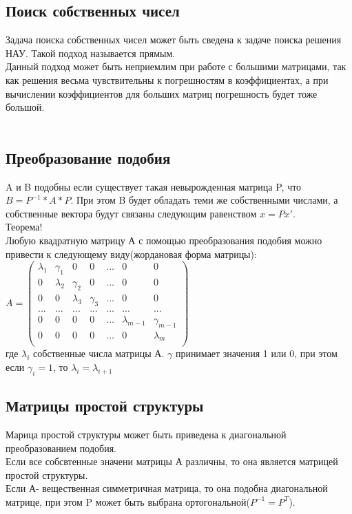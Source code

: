 \documentclass[16pt]{article}
\begin{document}
            \subsection{Поиск собственных чисел}
                Задача поиска собственных чисел может быть сведена к задаче поиска решения НАУ. Такой подход называется прямым.\\
                Данный подход может быть неприемлим при работе с большими матрицами, так как решения весьма чувствительны к погрешностям в коэффициентах, а при вычислении коэффициентов для больших матриц погрешность будет тоже большой.\\ \\
            \subsection{Преобразование подобия}
                A и B подобны если существует такая невырожденная матрица P, что $B = P^{-1}*A*P$. При этом B будет обладать теми же собственными числами, а собственные вектора будут связаны следующим равенством $x=Px'$.\\
                Теорема!\\
                Любую квадратную матрицу А с помощью преобразования подобия можно привести к следующему виду(жордановая форма матрицы):\\
                $A = 
                \begin{pmatrix}
                \lambda_1 & \gamma_1 & 0 & 0 & ... & 0 & 0\\
                0 & \lambda_2 & \gamma_2 & 0 & ... & 0 & 0\\
                0 & 0 & \lambda_3 & \gamma_3 & ... & 0 & 0\\
                ...&...&...&...&...&...&...\\
                0 & 0 & 0 & 0 & ... & \lambda_{m-1} & \gamma_{m-1}\\
                0 & 0 & 0 & 0 & ... & 0 & \lambda_{m}\\
                \end{pmatrix}$\\
                где $\lambda_i$ собственные числа матрицы А. $\gamma$ принимает значения 1 или 0, при этом если $\gamma_i=1$, то $\lambda_i=\lambda_{i+1}$\\
            \subsection{Матрицы простой структуры}
            Марица простой структуры может быть приведена к диагональной преобразованием подобия.\\
            Если все собсвтенные значени матрицы А различны, то она является матрицей простой структуры.\\
            Если А- вещественная симметричная матрица, то она подобна диагональной матрице, при этом P может быть выбрана ортогональной($P^{-1} = P^{T}$).\\		
\end{document}
